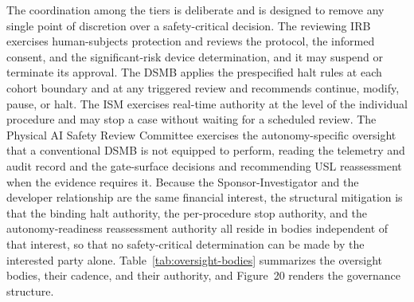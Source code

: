 The coordination among the tiers is deliberate and is designed to remove any single
point of discretion over a safety-critical decision. The reviewing IRB exercises
human-subjects protection and reviews the protocol, the informed consent, and the
significant-risk device determination, and it may suspend or terminate its approval.
The DSMB applies the prespecified halt rules at each cohort boundary and at any
triggered review and recommends continue, modify, pause, or halt. The ISM exercises
real-time authority at the level of the individual procedure and may stop a case
without waiting for a scheduled review. The Physical AI Safety Review Committee
exercises the autonomy-specific oversight that a conventional DSMB is not equipped to
perform, reading the telemetry and audit record and the gate-surface decisions and
recommending USL reassessment when the evidence requires it. Because the
Sponsor-Investigator and the developer relationship are the same financial interest,
the structural mitigation is that the binding halt authority, the per-procedure stop
authority, and the autonomy-readiness reassessment authority all reside in bodies
independent of that interest, so that no safety-critical determination can be made
by the interested party alone. Table~\ref{tab:oversight-bodies} summarizes the
oversight bodies, their cadence, and their authority, and Figure~20 renders the
governance structure.

